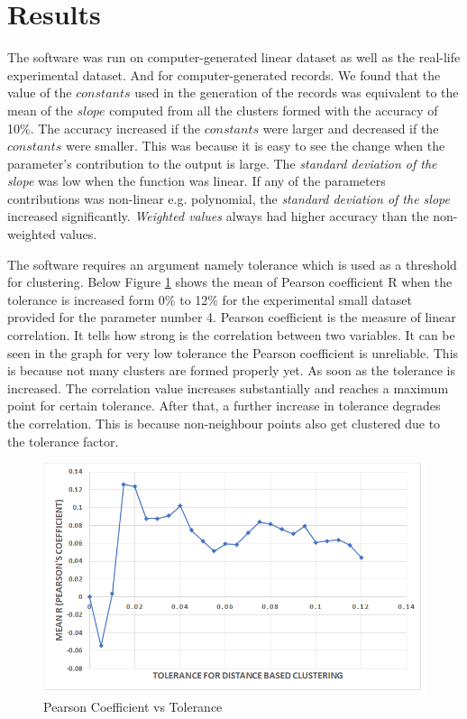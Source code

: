 \section{Results}

The software was run on computer-generated linear dataset as well as the real-life experimental dataset. And for computer-generated records. We found that the value of the \(constants\) used in the generation of the records was equivalent to the mean of the \(slope\) computed from all the clusters formed with the accuracy of 10\%. The accuracy increased if the \(constants\) were larger and decreased if the \(constants\) were smaller. This was because it is easy to see the change when the parameter's contribution to the output is large. The \textit{standard deviation of the slope} was low when the function was linear. If any of the parameters contributions was non-linear e.g. polynomial, the \textit{standard deviation of the slope} increased significantly. \textit{Weighted values} always had higher accuracy than the non-weighted values.

The software requires an argument namely tolerance which is used as a threshold for clustering. Below Figure \ref{fig:linegraph} shows the mean of Pearson coefficient R when the tolerance is increased form 0\% to 12\% for the experimental small dataset provided for the parameter number 4. Pearson coefficient is the measure of linear correlation. It tells how strong is the correlation between two variables. It can be seen in the graph for very low tolerance the Pearson coefficient is unreliable. This is because not many clusters are formed properly yet. As soon as the tolerance is increased. The correlation value increases substantially and reaches a maximum point for certain tolerance. After that, a further increase in tolerance degrades the correlation. This is because non-neighbour points also get clustered due to the tolerance factor.

\begin{figure}[!ht]
    \centering
    \includegraphics[width=400pt]{linegraph}
    \caption{\label{fig:linegraph} Pearson Coefficient vs Tolerance}
\end{figure}

